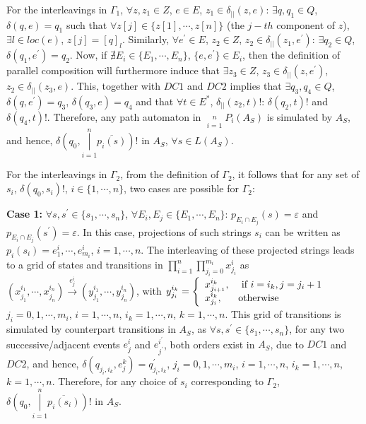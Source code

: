 For the interleavings in $\Gamma_1$, $\forall z, z_1 \in Z$, $e \in
E$, $z_1\in\delta_{||}(z, e)$: $\exists q, q_1 \in Q$, $\delta (q,
e) = q_1$ such that $\forall z[j]\in\{z[1], \cdots, z[n]\}$ (the
$j-th$ component of $z$), $\exists l \in loc(e)$, $z[j] = [q]_l$.
Similarly, $\forall e ^{\prime}\in E$, $z_2 \in Z$,
$z_2\in\delta_{||}(z_1, e^{\prime})$: $\exists q_2 \in Q$, $\delta (q_1,
e^{\prime}) = q_2$. Now, if $\nexists E_i \in \{E_1, \cdots, E_n\}$,
$\{e, e ^{\prime}\} \in E_i$, then the definition of parallel
composition will furthermore induce that $\exists z_3 \in Z$,
$z_3\in\delta_{||}(z, e ^{\prime})$, $z_2\in\delta_{||}(z_3, e)$.
This, together with $DC1$ and $DC2$ implies that $\exists q_3, q_4
\in Q$, $\delta(q, e ^{\prime}) = q_3$, $\delta(q_3, e) = q_4$ and
that $\forall t\in E^*$, $\delta_{||}(z_2, t)!$: $\delta(q_2, t)!$
and $\delta(q_4, t)!$. Therefore, any path automaton in $\mathop
{||}\limits_{i = 1}^n P_i(A_S)$ is simulated by $A_S$, and hence,
$\delta(q_0, \mathop {|}\limits_{i = 1}^n \overline{p_i(s)})!$ in
$A_S$, $\forall s\in L(A_S)$.

For the interleavings in $\Gamma_2$, from the definition of
$\Gamma_2$, it follows that for any set of $s_i$, $\delta(q_0,
s_i)!$, $i \in \{1,\cdots, n\}$, two cases are possible for
$\Gamma_2$:

\textbf{Case 1:} $\forall s, s^{\prime}\in \{s_1,\cdots, s_n\}$,
$\forall E_i, E_j \in \{E_1,\cdots, E_n\}$: $p_{E_i\cap E_j}(s) =
\varepsilon$ and $p_{E_i\cap E_j}(s^{\prime}) = \varepsilon$. In this case,
projections of such strings $s_i$ can be written as $p_i(s_i) =
e_1^i,\cdots,e_{m_i}^i$, $ i = 1,\cdots, n$. The interleaving of
these projected strings leads to a grid of states and transitions
in $\mathop {\prod}\limits_{i = 1}^n \mathop {\prod}\limits_{j_i =
0}^{m_i} x_{j_i}^i$ as
$(x_{j_1}^{i_1},\cdots,x_{j_n}^{i_n})\overset{ e_j^i
}\longrightarrow (y_{j_1}^{i_1},\cdots,y_{j_n}^{i_n})$, with
$y_{j_i}^{i_k} = \left\{
\begin{array}{ll}
   x_{j_{i+1}}^{i_k}, & \hbox{ if } i = i_k, j = j_i+1\\
   x_{j_i}^{i_k}, & \hbox{otherwise}
\end{array}\right.$
 $j_i =
0,1,\cdots,m_i$, $i = 1,\cdots,n$, $i_k = 1,\cdots,n$, $k =
1,\cdots,n$. This grid of transitions is simulated by counterpart
transitions in $A_S$, as $\forall s, s^{\prime}\in
\{s_1,\cdots,s_n\}$, for any two successive/adjacent events $e_j^i$
and $e_{j^{\prime}}^{i^{\prime}}$, both orders exist in $A_S$, due
to $DC1$ and $DC2$, and hence, $\delta(q_{j_i, i_k},e_j^k) = q_{j_i,
i_k}^{\prime}$, $j_i = 0, 1, \cdots, m_i$, $i = 1, \cdots, n$, $i_k =
1,\cdots,n$, $k = 1,\cdots,n$. Therefore, for any choice of $s_i$
corresponding to $\Gamma_2$, $\delta(q_0, \mathop {|}\limits_{i =
1}^n \overline{p_i(s_i)})!$ in $A_S$.


